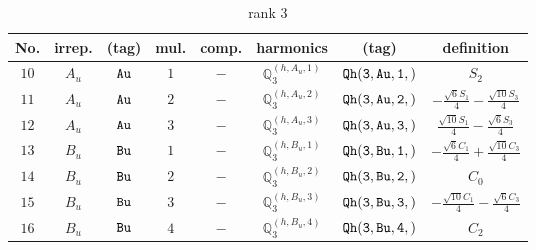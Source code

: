 \documentclass[fleqn,8pt]{jsarticle}
\begin{document}
\begin{table}[ht!]
\begin{center}
\caption{rank 3}
\renewcommand{\arraystretch}{1.3}
\begin{tabular}{cccccccc} \hline \hline
No. & irrep. & (tag) & mul. & comp. & harmonics & (tag) & definition \\ \hline
$ 10 $ & $ A_{u} $ & $ {\tt Au} $ & $ 1 $ & $ - $ & $ \mathbb{Q}_{3}^{(h,A_{u},1)} $ & $ {\tt Qh(3,Au,1,)} $ & $ S_{2} $ \\
$ 11 $ & $ A_{u} $ & $ {\tt Au} $ & $ 2 $ & $ - $ & $ \mathbb{Q}_{3}^{(h,A_{u},2)} $ & $ {\tt Qh(3,Au,2,)} $ & $ - \frac{\sqrt{6} S_{1}}{4} - \frac{\sqrt{10} S_{3}}{4} $ \\
$ 12 $ & $ A_{u} $ & $ {\tt Au} $ & $ 3 $ & $ - $ & $ \mathbb{Q}_{3}^{(h,A_{u},3)} $ & $ {\tt Qh(3,Au,3,)} $ & $ \frac{\sqrt{10} S_{1}}{4} - \frac{\sqrt{6} S_{3}}{4} $ \\
$ 13 $ & $ B_{u} $ & $ {\tt Bu} $ & $ 1 $ & $ - $ & $ \mathbb{Q}_{3}^{(h,B_{u},1)} $ & $ {\tt Qh(3,Bu,1,)} $ & $ - \frac{\sqrt{6} C_{1}}{4} + \frac{\sqrt{10} C_{3}}{4} $ \\
$ 14 $ & $ B_{u} $ & $ {\tt Bu} $ & $ 2 $ & $ - $ & $ \mathbb{Q}_{3}^{(h,B_{u},2)} $ & $ {\tt Qh(3,Bu,2,)} $ & $ C_{0} $ \\
$ 15 $ & $ B_{u} $ & $ {\tt Bu} $ & $ 3 $ & $ - $ & $ \mathbb{Q}_{3}^{(h,B_{u},3)} $ & $ {\tt Qh(3,Bu,3,)} $ & $ - \frac{\sqrt{10} C_{1}}{4} - \frac{\sqrt{6} C_{3}}{4} $ \\
$ 16 $ & $ B_{u} $ & $ {\tt Bu} $ & $ 4 $ & $ - $ & $ \mathbb{Q}_{3}^{(h,B_{u},4)} $ & $ {\tt Qh(3,Bu,4,)} $ & $ C_{2} $ \\
 \hline \hline
\end{tabular}
\end{center}
\end{table}
\end{document}
